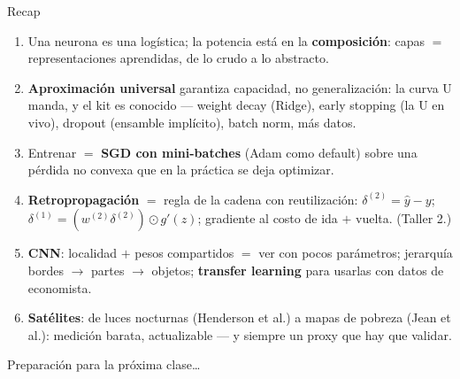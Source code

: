 \documentclass{beamer}
\newcommand{\1}{\mathbb{I}}
\begin{document}
\begin{frame}{Recap}
\small
\begin{enumerate}\itemsep6pt
  \item Una neurona es una logística; la potencia está en la \textbf{composición}: capas $=$ representaciones aprendidas, de lo crudo a lo abstracto.
  \item \textbf{Aproximación universal} garantiza capacidad, no generalización: la curva U manda, y el kit es conocido --- weight decay (Ridge), early stopping (la U en vivo), dropout (ensamble implícito), batch norm, más datos.
  \item Entrenar $=$ \textbf{SGD con mini-batches} (Adam como default) sobre una pérdida no convexa que en la práctica se deja optimizar.
  \item \textbf{Retropropagación} $=$ regla de la cadena con reutilización: $\delta^{(2)} = \hat{y} - y$; $\delta^{(1)} = (w^{(2)}\delta^{(2)}) \odot g'(z)$; gradiente al costo de ida $+$ vuelta. (Taller 2.)
  \item \textbf{CNN}: localidad $+$ pesos compartidos $=$ ver con pocos parámetros; jerarquía bordes $\rightarrow$ partes $\rightarrow$ objetos; \textbf{transfer learning} para usarlas con datos de economista.
  \item \textbf{Satélites}: de luces nocturnas (Henderson et al.) a mapas de pobreza (Jean et al.): medición barata, actualizable --- y siempre un proxy que hay que validar.
\end{enumerate}
\end{frame}

\begin{frame}
\vspace{2.0cm}
\Large{Preparación para la próxima clase\ldots}
\end{frame}

\end{document}
